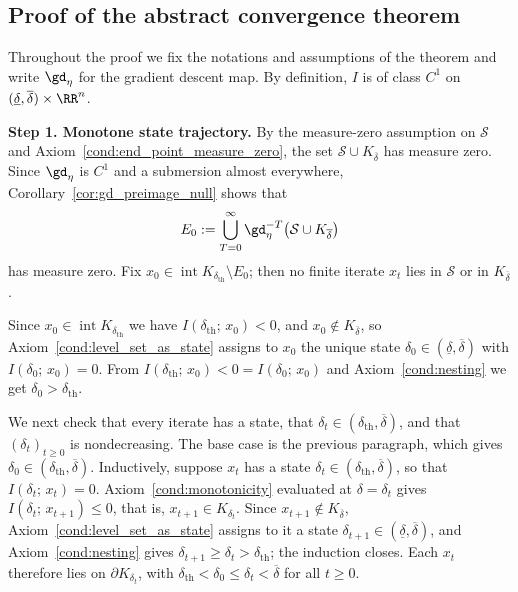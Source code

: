 \documentclass{article}
\begin{document}
\subsection{Proof of the abstract convergence theorem}
\label{sec:extension_state_dependent}

Throughout the proof we fix the notations and assumptions of the theorem and write
$\gd_\eta$ for the gradient descent map. By definition, $I$ is of class $C^1$
on $(\underline\delta,\overline\delta)\times\RR^n$.

\textbf{Step 1. Monotone state trajectory.}
By the measure-zero assumption on $\mathcal S$ and
Axiom~\ref{cond:end_point_measure_zero}, the set
$\mathcal S\cup K_{\overline\delta}$ has measure zero. Since
$\gd_\eta$ is $C^1$ and a submersion almost everywhere,
Corollary~\ref{cor:gd_preimage_null} shows that
\begin{align}
    E_0
    :=
    \bigcup_{T=0}^\infty
    \gd_\eta^{-T}\bigl(\mathcal S\cup K_{\overline\delta}\bigr)
    \label{eq:abstract_finite_time_exceptional}
\end{align}
has measure zero. Fix
$x_0\in\operatorname{int}K_{\delta_{\mathrm{th}}}\setminus E_0$; then no
finite iterate $x_t$ lies in $\mathcal S$ or in $K_{\overline\delta}$.

Since $x_0\in\operatorname{int}K_{\delta_{\mathrm{th}}}$ we have
$I(\delta_{\mathrm{th}};\,x_0)<0$, and $x_0\notin K_{\overline\delta}$, so
Axiom~\ref{cond:level_set_as_state} assigns to $x_0$ the unique state
$\delta_0\in(\underline\delta,\overline\delta)$ with $I(\delta_0;\,x_0)=0$.
From $I(\delta_{\mathrm{th}};\,x_0)<0=I(\delta_0;\,x_0)$ and
Axiom~\ref{cond:nesting} we get $\delta_0>\delta_{\mathrm{th}}$.

We next check that every iterate has a state, that
$\delta_t\in(\delta_{\mathrm{th}},\overline\delta)$, and that
$(\delta_t)_{t\ge0}$ is nondecreasing. The base case is the previous paragraph,
which gives $\delta_0\in(\delta_{\mathrm{th}},\overline\delta)$. Inductively,
suppose $x_t$ has a state $\delta_t\in(\delta_{\mathrm{th}},\overline\delta)$,
so that $I(\delta_t;\,x_t)=0$. Axiom~\ref{cond:monotonicity} evaluated
at $\delta=\delta_t$ gives $I(\delta_t;\,x_{t+1})\le 0$, that is,
$x_{t+1}\in K_{\delta_t}$. Since $x_{t+1}\notin K_{\overline\delta}$,
Axiom~\ref{cond:level_set_as_state} assigns to it a state
$\delta_{t+1}\in(\underline\delta,\overline\delta)$, and
Axiom~\ref{cond:nesting} gives
$\delta_{t+1}\ge\delta_t>\delta_{\mathrm{th}}$; the induction closes. Each
$x_t$ therefore lies on $\partial K_{\delta_t}$, with
$\delta_{\mathrm{th}}<\delta_0\le\delta_t<\overline\delta$ for all $t\ge0$.
\end{document}
